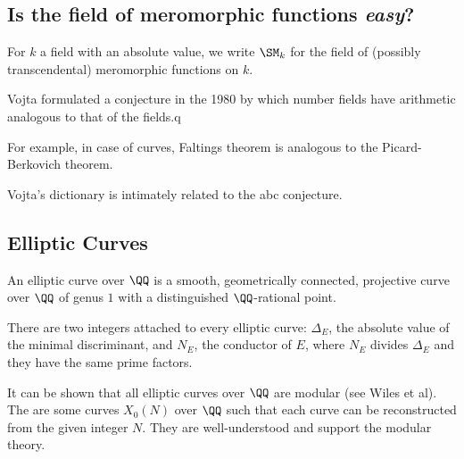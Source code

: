 \documentclass[11pt]{scrartcl}
\begin{document}
\subsection{Is the field of meromorphic functions \textit{easy}?}

For $k$ a field with an absolute value, we write $\SM_k$ for the field of (possibly transcendental) meromorphic functions on $k$.

Vojta formulated a conjecture in the 1980 by which number fields have arithmetic analogous to that of the fields.q

For example, in case of curves, Faltings theorem is analogous to the
Picard-Berkovich theorem.

Vojta's dictionary is intimately related to the abc conjecture.

\subsection{Elliptic Curves}

\begin{definition}
  An elliptic curve over $\QQ$ is a smooth, geometrically connected,
  projective curve over $\QQ$ of genus $1$ with a distinguished
  $\QQ$-rational point.
\end{definition}

There are two integers attached to every elliptic curve: $\Delta_E$,
the absolute value of the minimal discriminant, and $N_E$, the
conductor of $E$, where $N_E$ divides $\Delta_E$ and they have the
same prime factors.

It can be shown that all elliptic curves over $\QQ$ are modular (see
Wiles et al).  The are some curves $X_0(N)$ over $\QQ$ such that each
curve can be reconstructed from the given integer $N$. They are
well-understood and support the modular theory.
\end{document}
